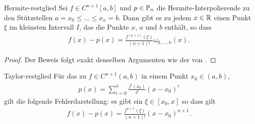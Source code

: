 \begin{Satz}{Hermite-restglied}
    Sei $f \in C^{n+1}[a,b]$ und $p\in \P_n$ die
  Hermite-Interpolierende zu den Stützstellen
  $a=x_0\le\dots\le x_n=b$. Dann gibt es zu jedem $x\in \R$ einen Punkt
  $\xi$ im kleinsten Intervall $I$, das die Punkte $x$, $a$ und $b$
  enthält, so dass
  \begin{gather}
    f(x)- p(x) = \frac{f^{(n+1)}(\xi)}{(n+1)!} \omega_{0,\dots,n}(x).
  \end{gather}
\end{Satz}

\begin{proof}
  Der Beweis folgt exakt denselben Argumenten wie der von
  .
\end{proof}

\begin{Korollar}{Taylor-restglied}
  Für das  zu $f\in C^{n+1}(a,b)$ in einem
  Punkt $x_0\in(a,b)$,
  \begin{gather}
    p(x) = \sum_{i=0}^n \frac{f^{i}(x_0)}{i!} (x-x_0)^i
  \end{gather}
  gilt die folgende Fehlerdarstellung: es gibt ein $\xi\in[x_0,x]$ so dass gilt
  \begin{gather}
    f(x) - p(x) = \frac{f^{n+1}(\xi)}{(n+1)!} (x-x_0)^{n+1}.
  \end{gather}
\end{Korollar}

